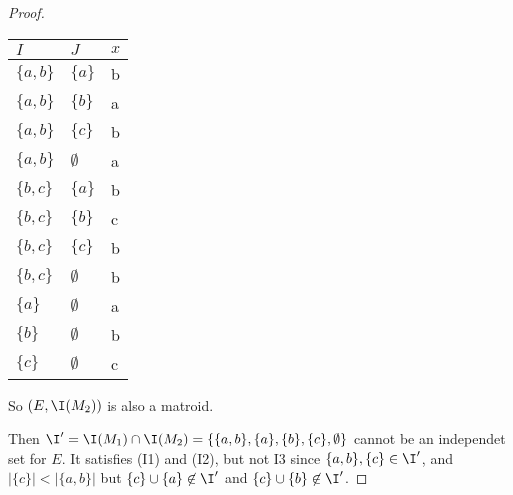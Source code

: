\begin{proof}
   \begin{center}
        \begin{tabular}{ | p{1cm} | p{1cm} | p{1cm} |}
            \hline $I$          & $J$           &   $x$ \\ \hline
            \hline $\{a, b\}$   & $\{a\}$       &  b    \\
            \hline $\{a, b\}$   & $\{b\}$       &  a    \\
            \hline $\{a, b\}$   & $\{c\}$       &  b    \\
            \hline $\{a, b\}$   & $\emptyset$   &  a    \\
            \hline $\{b, c\}$   & $\{a\}$       &  b    \\
            \hline $\{b, c\}$   & $\{b\}$       &  c    \\
            \hline $\{b, c\}$   & $\{c\}$       &  b    \\
            \hline $\{b, c\}$   & $\emptyset$   &  b    \\
            \hline $\{a\}$      & $\emptyset$   &  a    \\
            \hline $\{b\}$      & $\emptyset$   &  b    \\
            \hline $\{c\}$      & $\emptyset$   &  c    \\ \hline
        \end{tabular}    
    \end{center}
    
    So $(E, \I(M_2))$ is also a matroid.\pn
    
    Then $\I' = \I(M_1) \cap \I(M_2) = \{ \{a, b\}, \{a\}, \{b\}, \{c\}, \emptyset \}$ cannot be an independet set for $E$. 
    It satisfies (I1) and (I2), but not I3 since $\{a, b\}, \{c\} \in \I'$, and $|\{c\}| < |\{a, b\}|$ but 
    $\{c\} \cup \{a\} \not\in \I'$ and $\{c\} \cup \{b\} \not\in \I'$.
\end{proof}